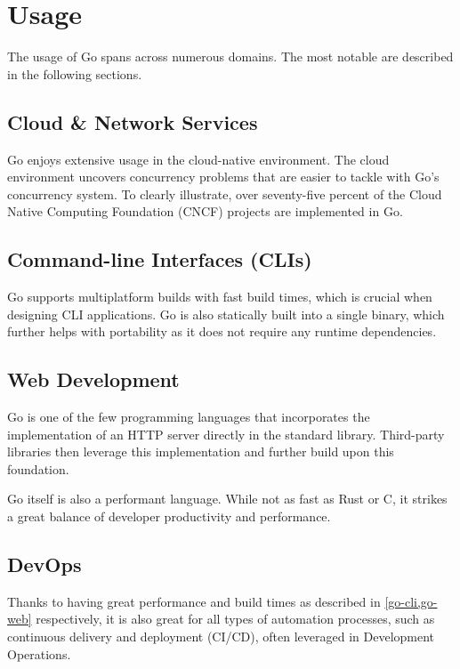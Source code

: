 \documentclass[
  digital,
  color,
  oneside,
  nosansbold,
  nocolorbold,
  lof,
  nolot,
]{fithesis4}
\begin{document}
\section{Usage}

The usage of Go spans across numerous domains. The most notable are described in the following sections.

\subsection{Cloud \& Network Services}

Go enjoys extensive usage in the cloud-native environment. The cloud environment uncovers concurrency problems that are easier to tackle with Go's concurrency system. To clearly illustrate, over seventy-five percent of the Cloud Native Computing Foundation (CNCF)\cite{cncf} projects are implemented in Go. \cite{go-cloud}

\subsection{Command-line Interfaces (CLIs)}\label{go-cli}

Go supports multiplatform builds with fast build times, which is crucial when designing CLI applications. Go is also statically built into a single binary, which further helps with portability as it does not require any runtime dependencies. \cite{go-cli}

\subsection{Web Development}\label{go-web}

Go is one of the few programming languages that incorporates the implementation of an HTTP server directly in the standard library. Third-party libraries then leverage this implementation and further build upon this foundation. 

Go itself is also a performant language. While not as fast as Rust\cite{rust} or C\cite{c}, it strikes a great balance of developer productivity and performance. \cite{benchmarks-game,go-web}

\subsection{DevOps}

Thanks to having great performance and build times as described in \cref{go-cli,go-web} respectively, it is also great for all types of automation processes, such as continuous delivery and deployment (CI/CD), often leveraged in Development Operations. \cite{go-devops}
\end{document}
